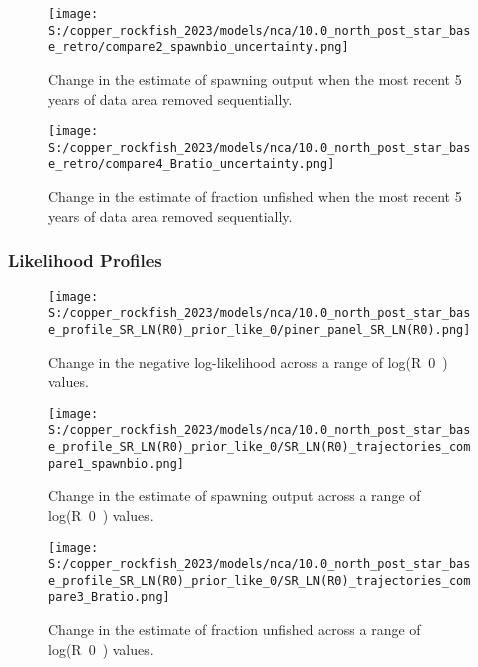 \documentclass[11pt,
  letterpaper,
]{article}
\begin{document}
\newpage

\begin{figure}
{\centering
\texttt{[image: S:/copper\_rockfish\_2023/models/nca/10.0\_north\_post\_star\_base\_retro/compare2\_spawnbio\_uncertainty.png]}
}
\caption{Change in the estimate of spawning output when the most recent 5 years of data area removed sequentially.\label{fig:retro-ssb}}
\end{figure}

\pagebreak

\begin{figure}
{\centering
\texttt{[image: S:/copper\_rockfish\_2023/models/nca/10.0\_north\_post\_star\_base\_retro/compare4\_Bratio\_uncertainty.png]}
}
\caption{Change in the estimate of fraction unfished when the most recent 5 years of data area removed sequentially.\label{fig:retro-depl}}
\end{figure}

\pagebreak

\subsubsection{Likelihood Profiles}\label{likelihood-profiles-1}

\begin{figure}
{\centering
\texttt{[image: S:/copper\_rockfish\_2023/models/nca/10.0\_north\_post\_star\_base\_profile\_SR\_LN(R0)\_prior\_like\_0/piner\_panel\_SR\_LN(R0).png]}
}
\caption{Change in the negative log-likelihood across a range of log(R~0~) values.\label{fig:r0-profile}}
\end{figure}

\pagebreak

\begin{figure}
{\centering
\texttt{[image: S:/copper\_rockfish\_2023/models/nca/10.0\_north\_post\_star\_base\_profile\_SR\_LN(R0)\_prior\_like\_0/SR\_LN(R0)\_trajectories\_compare1\_spawnbio.png]}
}
\caption{Change in the estimate of spawning output across a range of log(R~0~) values.\label{fig:r0-ssb}}
\end{figure}

\pagebreak

\begin{figure}
{\centering
\texttt{[image: S:/copper\_rockfish\_2023/models/nca/10.0\_north\_post\_star\_base\_profile\_SR\_LN(R0)\_prior\_like\_0/SR\_LN(R0)\_trajectories\_compare3\_Bratio.png]}
}
\caption{Change in the estimate of fraction unfished across a range of log(R~0~) values.\label{fig:r0-depl}}
\end{figure}
\end{document}
